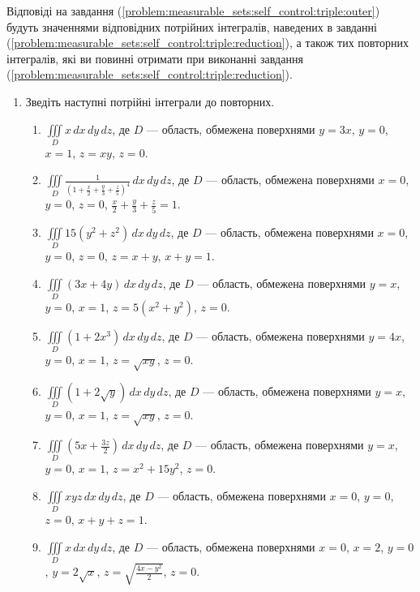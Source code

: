 Відповіді на завдання (\ref{problem:measurable_sets:self_control:triple:outer}) будуть значеннями відповідних потрійних інтегралів, наведених в завданні (\ref{problem:measurable_sets:self_control:triple:reduction}), а також тих повторних інтегралів, які ви повинні отримати при виконанні завдання (\ref{problem:measurable_sets:self_control:triple:reduction}).
\begin{enumerate}
\item\label{problem:measurable_sets:self_control:triple:reduction} Зведіть наступні потрійні інтеграли до повторних.
    \begin{enumerate}[label*=\arabic*.]
        \item $\iiint\limits_D x \,dx\,dy\,dz$, де $D$ --- область, обмежена поверхнями ${y = 3 x}$, ${y = 0}$, ${x = 1}$, ${z = x y}$, ${z = 0}$.
        \item $\iiint\limits_D \frac{1}{\left(1+\frac{x}{2}+\frac{y}{3}+\frac{z}{5}\right)^{4}} \,dx\,dy\,dz$, де $D$ --- область, обмежена поверхнями ${x = 0}$, ${y = 0}$, ${z = 0}$, ${\frac{x}{2}+\frac{y}{3}+\frac{z}{5} = 1}$.
        \item $\iiint\limits_D 15\left(y^{2}+z^{2}\right) \,dx\,dy\,dz$, де $D$ --- область, обмежена поверхнями ${x = 0}$, ${y = 0}$, ${z = 0}$, ${z = x + y}$, ${x + y = 1}$.
        \item $\iiint\limits_D \left(3x+4y\right) \,dx\,dy\,dz$, де $D$ --- область, обмежена поверхнями ${y = x}$, ${y = 0}$, ${x = 1}$, ${z = 5\left(x^2 + y^2 \right)}$, ${z = 0}$.
        \item $\iiint\limits_D \left(1+2x^{3}\right) \,dx\,dy\,dz$, де $D$ --- область, обмежена поверхнями ${y = 4 x}$, ${y = 0}$, ${x = 1}$, ${z = \sqrt{x y}}$, ${z = 0}$.
        \item $\iiint\limits_D \left(1+2\sqrt{y}\right) \,dx\,dy\,dz$, де $D$ --- область, обмежена поверхнями ${y = x}$, ${y = 0}$, ${x = 1}$, ${z = \sqrt{x y}}$, ${z = 0}$.
        \item $\iiint\limits_D \left(5x+\frac{3z}{2}\right) \,dx\,dy\,dz$, де $D$ --- область, обмежена поверхнями ${y = x}$, ${y = 0}$, ${x = 1}$, ${z = x^2 + 15y^2}$, ${z = 0}$.
        \item $\iiint\limits_D x y z \,dx\,dy\,dz$, де $D$ --- область, обмежена поверхнями  ${x = 0}$, ${y = 0}$, ${z = 0}$, ${x + y + z = 1}$.
        \item $\iiint\limits_D x \,dx\,dy\,dz$, де $D$ --- область, обмежена поверхнями ${x = 0}$, ${x = 2}$, ${y = 0}$, ${y = 2\sqrt{x}}$,  ${z = \sqrt{\frac{4 x - y^2}{2}}}$, ${z = 0}$.

\end{enumerate}
\end{enumerate}

